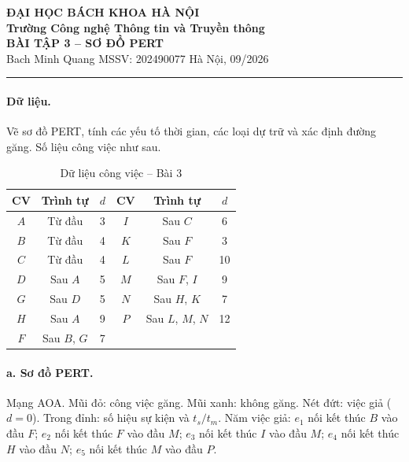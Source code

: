 \documentclass[12pt,a4paper]{article}
\begin{document}
\begin{center}
  {\large\bfseries ĐẠI HỌC BÁCH KHOA HÀ NỘI}\\[0.4pt]
  {\bfseries Trường Công nghệ Thông tin và Truyền thông}\\[3.5pt]
  {\Large\bfseries BÀI TẬP 3 -- SƠ ĐỒ PERT}\\[0.5pt]
  {\small Bach Minh Quang \quad MSSV: 202490077 \quad Hà Nội, 09/2026}
\end{center}
\vspace{-2pt}
\hrule
\vspace{5pt}

\paragraph{Dữ liệu.}
Vẽ sơ đồ PERT, tính các yếu tố thời gian, các loại dự trữ và xác định đường găng.
Số liệu công việc như sau.

\begin{table}[H]\centering
\caption{Dữ liệu công việc -- Bài 3}
\small
\begin{tabular}{cccccc}
\toprule
\textbf{CV} & \textbf{Trình tự} & \textbf{$d$} &
\textbf{CV} & \textbf{Trình tự} & \textbf{$d$}\\
\midrule
$A$ & Từ đầu & 3 & $I$ & Sau $C$ & 6\\
$B$ & Từ đầu & 4 & $K$ & Sau $F$ & 3\\
$C$ & Từ đầu & 4 & $L$ & Sau $F$ & 10\\
$D$ & Sau $A$ & 5 & $M$ & Sau $F$, $I$ & 9\\
$G$ & Sau $D$ & 5 & $N$ & Sau $H$, $K$ & 7\\
$H$ & Sau $A$ & 9 & $P$ & Sau $L$, $M$, $N$ & 12\\
$F$ & Sau $B$, $G$ & 7 & & & \\
\bottomrule
\end{tabular}
\end{table}

\paragraph{a. Sơ đồ PERT.}
Mạng AOA. Mũi đỏ: công việc găng. Mũi xanh: không găng. Nét đứt: việc giả ($d=0$).
Trong đỉnh: số hiệu sự kiện và $t_s/t_m$.
Năm việc giả:
$e_1$ nối kết thúc $B$ vào đầu $F$;
$e_2$ nối kết thúc $F$ vào đầu $M$;
$e_3$ nối kết thúc $I$ vào đầu $M$;
$e_4$ nối kết thúc $H$ vào đầu $N$;
$e_5$ nối kết thúc $M$ vào đầu $P$.
\end{document}
